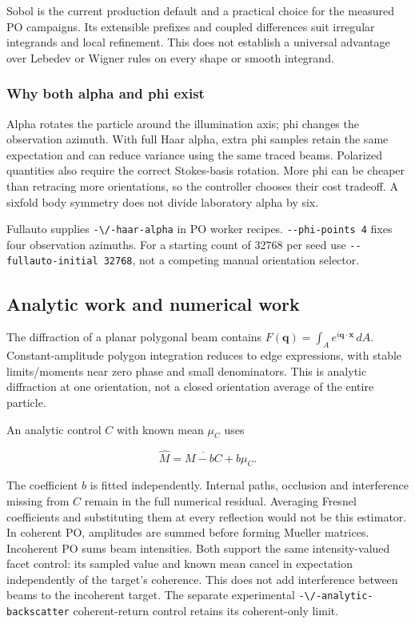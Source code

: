 Sobol is the current production default and a practical choice for the
measured PO campaigns. Its extensible prefixes and coupled differences
suit irregular integrands and local refinement. This does not establish
a universal advantage over Lebedev or Wigner rules on every shape or
smooth integrand.

\subsubsection{Why both alpha and phi
exist}\label{why-both-alpha-and-phi-exist}

Alpha rotates the particle around the illumination axis; phi changes the
observation azimuth. With full Haar alpha, extra phi samples retain the
same expectation and can reduce variance using the same traced beams.
Polarized quantities also require the correct Stokes-basis rotation.
More phi can be cheaper than retracing more orientations, so the
controller chooses their cost tradeoff. A sixfold body symmetry does not
divide laboratory alpha by six.

Fullauto supplies \nolinkurl{-\/-haar-alpha} in PO worker recipes.
\texttt{-\/-phi-points\ 4} fixes four observation azimuths. For a
starting count of 32768 per seed use
\texttt{-\/-fullauto-initial\ 32768}, not a competing manual orientation
selector.

\subsection{Analytic work and numerical
work}\label{analytic-work-and-numerical-work}

The diffraction of a planar polygonal beam contains
\(F(\mathbf q)=\int_A e^{i\mathbf q\cdot\mathbf x}\,dA\).
Constant-amplitude polygon integration reduces to edge expressions, with
stable limits/moments near zero phase and small denominators. This is
analytic diffraction at one orientation, not a closed orientation
average of the entire particle.

An analytic control \(C\) with known mean \(\mu_C\) uses

\[\widehat M=\overline{M-bC}+b\mu_C.\]

The coefficient \(b\) is fitted independently. Internal paths, occlusion
and interference missing from \(C\) remain in the full numerical
residual. Averaging Fresnel coefficients and substituting them at every
reflection would not be this estimator. In coherent PO, amplitudes are
summed before forming Mueller matrices. Incoherent PO sums beam
intensities. Both support the same intensity-valued facet control: its
sampled value and known mean cancel in expectation independently of the
target's coherence. This does not add interference between beams to the
incoherent target. The separate experimental
\nolinkurl{-\/-analytic-backscatter} coherent-return control retains its
coherent-only limit.

